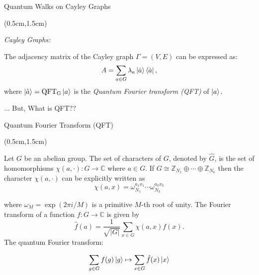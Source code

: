 \documentclass{beamer}
\theoremstyle{definition}
\begin{document}
\begin{frame}{Quantum Walks on Cayley Graphs}
    
    \begin{textblock*}{12cm}(0.5cm,1.5cm)
        
        \textit{Cayley Graphs:} \\
        \vspace{0.3cm}
        
        The adjacency matrix of the Cayley graph $\Gamma = (V,E)$ can be expressed as:
        \[ A = \sum_{a \in G} \lambda_a \ket{\hat{a}} \bra{\hat{a}}, \]
        where $\ket{\hat{a}} = \operatorname{QFT_G} \ket{a}$ is the \textit{Quantum Fourier transform (QFT)} of $\ket{a}$. \\
         \vspace{0.5cm}

        \vspace{2cm}
        
        ... But, What is QFT??
    \end{textblock*}


\end{frame}




\begin{frame}{Quantum Fourier Transform (QFT)}
    
    \begin{textblock*}{12cm}(0.5cm,1.5cm)

            
    Let $G$ be an abelian group. The set of characters of $G$, denoted by $\hat{G}$, is the set of homomorphisms $\chi(a, \cdot): G \to \mathbb{C}$ where $a \in G$. If $G \cong \mathbb{Z}_{N_1} \oplus \cdots \oplus \mathbb{Z}_{N_k}$ then the character $\chi(a, \cdot)$ can be explicitly written as
    \[ \chi(a, x) = \omega_{N_1}^{a_1x_1} \cdots \omega_{N_k}^{a_kx_k} \]
            
    where $\omega_M = \exp(2\pi i/ M)$ is a primitive $M$-th root of unity. The Fourier transform of a function $f: G \to \mathbb{C}$ is given by
    \[ \hat{f}(a) = \frac{1}{\sqrt{|G|}} \sum_{x \in G} \chi(a, x) f(x). \]
    The quantum Fourier transform:
    
    \[
        \sum_{g \in G} f(g) \ket{g} \mapsto \sum_{x \in G} \hat{f}(x)\ket{x}
    \]
   


       
    \end{textblock*}


\end{frame}
\end{document}
